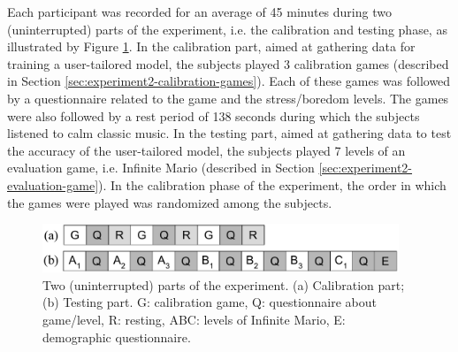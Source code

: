 Each participant was recorded for an average of 45 minutes during two (uninterrupted) parts of the experiment, i.e. the calibration and testing phase, as illustrated by Figure \ref{fig:experiment2-parts}. In the calibration part, aimed at gathering data for training a user-tailored model, the subjects played 3 calibration games (described in Section \ref{sec:experiment2-calibration-games}). Each of these games was followed by a questionnaire related to the game and the stress/boredom levels. The games were also followed by a rest period of 138 seconds during which the subjects listened to calm classic music. In the testing part, aimed at gathering data to test the accuracy of the user-tailored model, the subjects played 7 levels of an evaluation game, i.e. Infinite Mario (described in Section \ref{sec:experiment2-evaluation-game}). In the calibration phase of the experiment, the order in which the games were played was randomized among the subjects.


\begin{figure}[ht]
  \centering
  \includegraphics[width=0.95\textwidth]{Content/figures/experiment2-parts}
  \caption{Two (uninterrupted) parts of the experiment. (a) Calibration part; (b) Testing part. G: calibration game, Q: questionnaire about game/level, R: resting, ABC: levels of Infinite Mario, E: demographic questionnaire.}
  \label{fig:experiment2-parts}
\end{figure}

